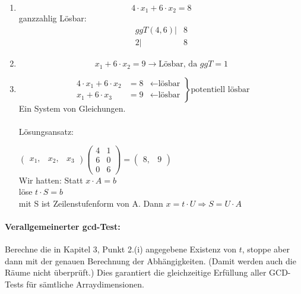 \begin{enumerate}
  \item {
      \[4 \cdot x_1 + 6 \cdot x_2 = 8 \]
      ganzzahlig Lösbar: \\
      \begin{align*}
         ggT(4,6) |& 8\\
               2  |& 8
      \end{align*}
    }
  \item {\[x_1 + 6 \cdot x_2 = 9 \rightarrow \text{Lösbar, da } ggT = 1 \]}
  \item {
      \[ \left.
          \begin{split}
            4 \cdot x_1 + 6 \cdot x_2 &= 8 &\leftarrow \text{lösbar}\\
            x_1 + 6 \cdot x_3 &= 9 &\leftarrow \text{lösbar}
          \end{split}
       \right\rbrace{\text{potentiell lösbar}} \]
       Ein System von Gleichungen.\\
\\
       Lösungsansatz:

\( \begin{pmatrix}
    x_1 ,& x_2 ,& x_3
   \end{pmatrix}
   \begin{pmatrix}
     4 & 1\\
     6 & 0\\
     0 & 6
   \end{pmatrix}
=
   \begin{pmatrix}
     8 ,& 9
   \end{pmatrix}
\) \\
Wir hatten: Statt \(x \cdot A = b  \) \\
          löse \( t \cdot S = b \) \\
          mit S ist Zeilenstufenform von A.
          Dann \( x = t \cdot U \Rightarrow S = U \cdot A \)
        }

\end{enumerate}

\smallskip

\paragraph{Verallgemeinerter gcd-Test:} Berechne die in Kapitel 3, Punkt 2.(i)
angegebene Existenz von $t$, stoppe aber dann mit der genauen
Berechnung der Abhängigkeiten. (Damit werden auch die Räume nicht
überprüft.)  Dies garantiert die gleichzeitige Erfüllung aller
GCD-Tests für sämtliche Arraydimensionen.

